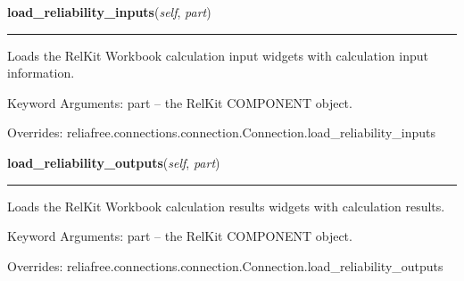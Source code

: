     \vspace{0.5ex}

\hspace{.8\funcindent}\begin{boxedminipage}{\funcwidth}

    \raggedright \textbf{load\_reliability\_inputs}(\textit{self}, \textit{part})

    \vspace{-1.5ex}

    \rule{\textwidth}{0.5\fboxrule}
\setlength{\parskip}{2ex}
    Loads the RelKit Workbook calculation input widgets with calculation
    input information.

    Keyword Arguments: part -- the RelKit COMPONENT object.

\setlength{\parskip}{1ex}
      Overrides: reliafree.connections.connection.Connection.load\_reliability\_inputs

    \end{boxedminipage}

    \vspace{0.5ex}

\hspace{.8\funcindent}\begin{boxedminipage}{\funcwidth}

    \raggedright \textbf{load\_reliability\_outputs}(\textit{self}, \textit{part})

    \vspace{-1.5ex}

    \rule{\textwidth}{0.5\fboxrule}
\setlength{\parskip}{2ex}
    Loads the RelKit Workbook calculation results widgets with 
    calculation results.

    Keyword Arguments: part -- the RelKit COMPONENT object.

\setlength{\parskip}{1ex}
      Overrides: reliafree.connections.connection.Connection.load\_reliability\_outputs

    \end{boxedminipage}

    \label{reliafree:connections:pcb:PCBEdge:calculate_mil_217_count}

    \vspace{0.5ex}

